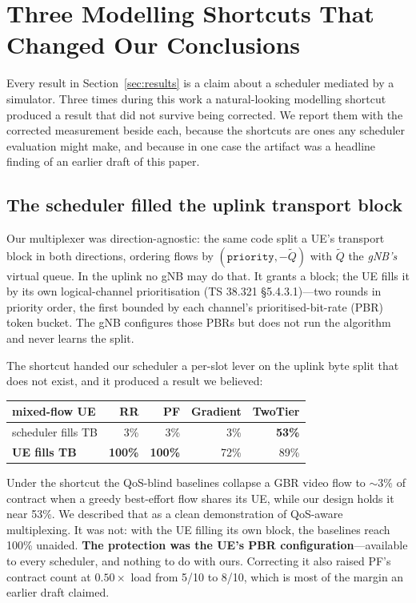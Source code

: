 \documentclass[conference]{IEEEtran}
\begin{document}
\section{Three Modelling Shortcuts That Changed Our Conclusions}\label{sec:fidelity}

Every result in Section~\ref{sec:results} is a claim about a scheduler
mediated by a simulator. Three times during this work a natural-looking
modelling shortcut produced a result that did not survive being corrected.
We report them with the corrected measurement beside each, because the
shortcuts are ones any scheduler evaluation might make, and because in one
case the artifact was a headline finding of an earlier draft of this paper.

\subsection{The scheduler filled the uplink transport block}

Our multiplexer was direction-agnostic: the same code split a UE's transport
block in both directions, ordering flows by
$(\texttt{priority}, -\tilde{Q})$ with $\tilde{Q}$ the \emph{gNB's} virtual
queue. In the uplink no gNB may do that. It grants a block; the UE fills it
by its own logical-channel prioritisation (TS 38.321
\S5.4.3.1)---two rounds in priority order, the first bounded by each
channel's prioritised-bit-rate (PBR) token bucket. The gNB configures those
PBRs but does not run the algorithm and never learns the split.

The shortcut handed our scheduler a per-slot lever on the uplink byte split
that does not exist, and it produced a result we believed:

\begin{center}\small
\begin{tabular}{@{}lrrrr@{}}
\toprule
mixed-flow UE & RR & PF & Gradient & TwoTier \\
\midrule
scheduler fills TB & 3\% & 3\% & 3\% & \textbf{53\%} \\
\textbf{UE fills TB} & \textbf{100\%} & \textbf{100\%} & 72\% & 89\% \\
\bottomrule
\end{tabular}
\end{center}

Under the shortcut the QoS-blind baselines collapse a GBR video flow to
${\sim}3\%$ of contract when a greedy best-effort flow shares its UE, while
our design holds it near 53\%. We described that as a clean demonstration of
QoS-aware multiplexing. It was not: with the UE filling its own block, the
baselines reach 100\% unaided. \textbf{The protection was the UE's PBR
configuration}---available to every scheduler, and nothing to do with ours.
Correcting it also raised PF's contract count at $0.50\times$ load from 5/10
to 8/10, which is most of the margin an earlier draft claimed.
\end{document}
